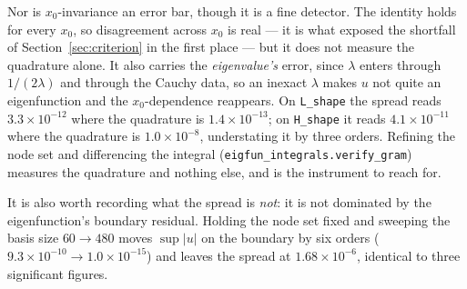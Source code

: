 \documentclass[11pt]{article}
\theoremstyle{remark}
\begin{document}
Nor is $x_0$-invariance an error bar, though it is a fine detector. The identity
holds for every $x_0$, so disagreement across $x_0$ is real --- it is what exposed
the shortfall of Section~\ref{sec:criterion} in the first place --- but it does not
measure the quadrature alone. It also carries the \emph{eigenvalue's} error, since
$\lambda$ enters through $1/(2\lambda)$ and through the Cauchy data, so an inexact
$\lambda$ makes $u$ not quite an eigenfunction and the $x_0$-dependence reappears.
On \verb|L_shape| the spread reads $3.3\times10^{-12}$ where the quadrature is
$1.4\times10^{-13}$; on \verb|H_shape| it reads $4.1\times10^{-11}$ where the
quadrature is $1.0\times10^{-8}$, understating it by three orders. Refining the
node set and differencing the integral (\verb|eigfun_integrals.verify_gram|)
measures the quadrature and nothing else, and is the instrument to reach for.

It is also worth recording what the spread is \emph{not}: it is not dominated by
the eigenfunction's boundary residual. Holding the node set fixed and sweeping the
basis size $60\to480$ moves $\sup|u|$ on the boundary by six orders
($9.3\times10^{-10}\to1.0\times10^{-15}$) and leaves the spread at
$1.68\times10^{-6}$, identical to three significant figures.
\end{document}

